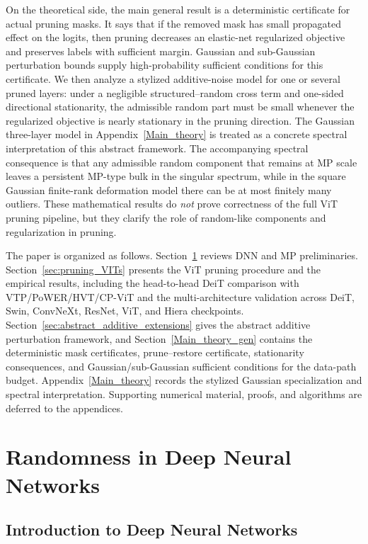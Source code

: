 \documentclass[11pt]{article}
\theoremstyle{plain}
\theoremstyle{definition}
\theoremstyle{remark}
\newcommand{\1}{\mathbf{1}}
\begin{document}
On the theoretical side, the main general result is a deterministic certificate for actual pruning masks.  It says that if the removed mask has small propagated effect on the logits, then pruning decreases an elastic-net regularized objective and preserves labels with sufficient margin.  Gaussian and sub-Gaussian perturbation bounds supply high-probability sufficient conditions for this certificate.  We then analyze a stylized additive-noise model for one or several pruned layers: under a negligible structured--random cross term and one-sided directional stationarity, the admissible random part must be small whenever the regularized objective is nearly stationary in the pruning direction.  The Gaussian three-layer model in Appendix~\ref{Main_theory} is treated as a concrete spectral interpretation of this abstract framework.  The accompanying spectral consequence is that any admissible random component that remains at MP scale leaves a persistent MP-type bulk in the singular spectrum, while in the square Gaussian finite-rank deformation model there can be at most finitely many outliers.  These mathematical results do \emph{not} prove correctness of the full ViT pruning pipeline, but they clarify the role of random-like components and regularization in pruning.

The paper is organized as follows.  Section~\ref{sec:randomness} reviews DNN and MP preliminaries.  Section~\ref{sec:pruning_VITs} presents the ViT pruning procedure and the empirical results, including the head-to-head DeiT comparison with VTP/PoWER/HVT/CP-ViT and the multi-architecture validation across DeiT, Swin, ConvNeXt, ResNet, ViT, and Hiera checkpoints.  Section~\ref{sec:abstract_additive_extensions} gives the abstract additive perturbation framework, and Section~\ref{Main_theory_gen} contains the deterministic mask certificates, prune--restore certificate, stationarity consequences, and Gaussian/sub-Gaussian sufficient conditions for the data-path budget.  Appendix~\ref{Main_theory} records the stylized Gaussian specialization and spectral interpretation.  Supporting numerical material, proofs, and algorithms are deferred to the appendices.

\section{Randomness in Deep Neural Networks}
\label{sec:randomness}

\subsection{Introduction to Deep Neural Networks}
\label{introduction_deep_neural_networks}
\end{document}
